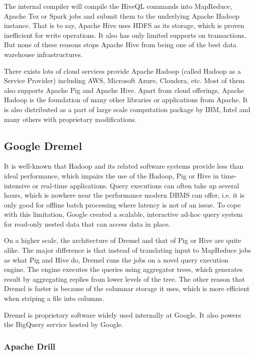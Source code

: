 \documentclass{article}
\begin{document}
The internal compiler will compile the HiveQL commands into MapReduce, Apache Tez or Spark jobs and submit them to the underlying Apache Hadoop instance.\cite{wiki:hive} That is to say, Apache Hive uses HDFS as its storage, which is proven inefficient for write operations. It also has only limited supports on transactions. But none of these reasons stops Apache Hive from being one of the best data warehouse infrastructures.

There exists lots of cloud services provide Apache Hadoop (called Hadoop as a Service Provider) including AWS, Microsoft Azure, Cloudera, etc. Most of them also supports Apache Pig and Apache Hive. Apart from cloud offerings, Apache Hadoop is the foundation of many other libraries or applications from Apache. It is also distributed as a part of large scale computation package by IBM, Intel and many others with proprietary modifications.\cite{top-10-hadoop}


\subsection{Google Dremel}

It is well-known that Hadoop and its related software systems provide less than ideal performance, which impairs the use of the Hadoop, Pig or Hive in time-intensive or real-time applications. Query executions can often take up several hours, which is nowhere near the performance modern DBMS can offer, i.e. it is only good for offline batch processing where latency is not of an issue.\cite{kalavri2013mapreduce} To cope with this limitation, Google created a scalable, interactive ad-hoc query system for read-only nested data that can access data in place.\cite{melnik2010dremel}

On a higher scale, the architecture of Dremel and that of Pig or Hive are quite alike. The major difference is that instead of translating input to MapReduce jobs as what Pig and Hive do, Dremel runs the jobs on a novel query execution engine. The engine executes the queries using aggregator trees, which generates result by aggregating replies from lower levels of the tree. The other reason that Dremel is faster is because of the columnar storage it uses, which is more efficient when striping a file into columns.\cite{melnik2010dremel}

Dremel is proprietary software widely used internally at Google. It also powers the BigQuery service hosted by Google.

\subsubsection{Apache Drill}
\end{document}
